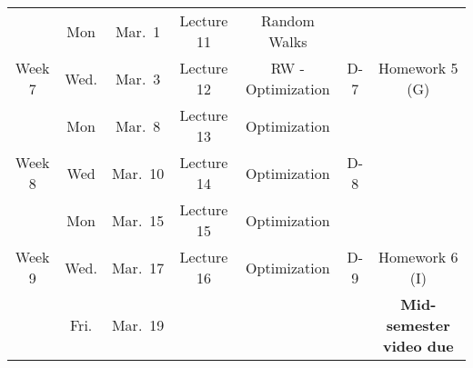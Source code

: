 \documentclass[12pt]{article}
\newcommand{\un}{\mbox{D}}
\newcommand{\tro}{\mbox{D}}
\begin{document}
{\begin{tabular}{ccccccc}
  \hline  
  & Mon & Mar.~1   & Lecture 11 &  Random Walks  &    & \\
  Week 7    & Wed.& Mar.~3  &    Lecture 12   &  RW - Optimization & D-7  & Homework 5 (G) \\
  \hline  
         & Mon & Mar.~8   & Lecture 13 & Optimization &   &\\
   { Week 8}      & Wed & Mar.~10  &   Lecture 14 &   Optimization& D-8 &  \\
%
%
  \hline
          & Mon & Mar.~15  & Lecture 15 & Optimization&   & \\
{  Week 9}  & Wed. & Mar.~17  & Lecture 16 & Optimization& D-9 & Homework 6 (I) \\
& Fri. & Mar.~19  &  & &  & \textbf{Mid-semester video due} \\


\end{tabular}}
\end{document}
